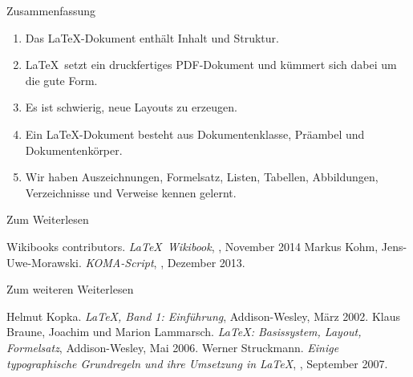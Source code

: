 \begin{frame}{Zusammenfassung}
  \begin{enumerate}
    \item Das \alert{\LaTeX-Dokument} enthält \alert{Inhalt und Struktur}.
    \item \LaTeX\ setzt ein druckfertiges \alert{PDF-Dokument} und kümmert sich dabei um die \alert{gute Form}.
    \item Es ist schwierig, \alert{neue Layouts} zu erzeugen.
    \item Ein \LaTeX-Dokument besteht aus \alert{Dokumentenklasse}, \alert{Präambel} und \alert{Dokumentenkörper}.
    \item Wir haben \alert{Auszeichnungen}, \alert{Formelsatz}, \alert{Listen}, \alert{Tabellen}, \alert{Abbildungen}, \alert{Verzeichnisse} und \alert{Verweise} kennen gelernt.
  \end{enumerate}
\end{frame}

\begin{Frame}[fragile]{Zum Weiterlesen}
  \begin{mybib}
      Wikibooks contributors.
      \newblock \emph{\LaTeX\ Wikibook},
      \newblock {}, November 2014
      Markus Kohm, Jens-Uwe-Morawski.
      \newblock \emph{KOMA-Script},
      \newblock {}, Dezember 2013.
  \end{mybib}
\end{Frame}

\begin{Frame}[fragile]{Zum weiteren Weiterlesen}
  \begin{mybib}
      Helmut Kopka.
      \newblock \emph{\LaTeX, Band 1: Einführung},
      \newblock Addison-Wesley, März 2002.
      Klaus Braune, Joachim und Marion Lammarsch.
      \newblock \emph{\LaTeX: Basissystem, Layout, Formelsatz},
      \newblock Addison-Wesley, Mai 2006.
      Werner Struckmann.
      \newblock \emph{Einige typographische Grundregeln und ihre Umsetzung in \LaTeX},
      \newblock {}, September 2007.
  \end{mybib}
\end{Frame}
